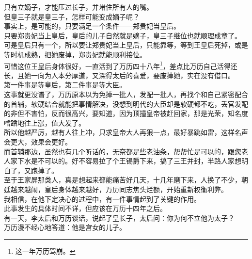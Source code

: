 \begin{multicols}{\theparacolNo}
只有立嫡子，才能压过长子，并堵住所有人的嘴。\\

但皇三子就是皇三子，怎样可能变成嫡子呢？\\

事实上，是可能的，只要满足一个条件——郑贵妃当皇后。\\

只要郑贵妃当上皇后，皇后的儿子自然就是嫡子，皇三子继位也就顺理成章了。\\

可是皇后只有一个，所以要让郑贵妃当上皇后，只能靠等，等到王皇后死掉，或是等时机成熟，把她废掉，郑贵妃就能顺利接位。\\

可惜这位王皇后身体很好，一直活到了万历四十八年\footnote{这一年万历驾崩。}，差点比万历自己活得还长，且她一向为人本分厚道，又深得太后的喜爱，要废掉她，实在没有借口。\\

第一件事是等皇后，第二件事是等大臣。\\

这事就更没谱了，万历原本以为免掉一批人，发配一批人，再找个和自己紧密配合的首辅，软硬结合就能把事情解决，没想到明代的大臣却是软硬都不吃，丢官发配的非但不害怕，反而很高兴，要知道，因为顶撞皇帝被赶回家，那是光荣，知名度噌蹭地往上涨，值大发了。\\

所以他越严厉，越有人往上冲，只求皇帝大人再狠一点，最好暴跳如雷，这样名声会更大，效果会更好。\\

而首辅那边，虽然也有几个听话的，无奈都是些老油条，帮帮忙是可以的，跟您老人家下水是不可以的。好不容易拉了个王锡爵下来，搞了三王并封，半路人家想明白了，又跑掉了。\\

至于王家屏那类人，真是想起来都能痛苦好几天，十几年磨下来，人换了不少，朝廷越来越闹，皇后身体越来越好，万历同志焦头烂额，开始重新权衡利弊。\\

我相信，在他下定决心的过程中，有一件事情起到了关键的作用。\\

此事发生的具体时间不详，但应该在万历十四年之后。\\

有一天，李太后和万历谈话，说起了皇长子，太后问：你为何不立他为太子？\\

万历漫不经心地答道：他是宫女的儿子。\\


\end{multicols}
